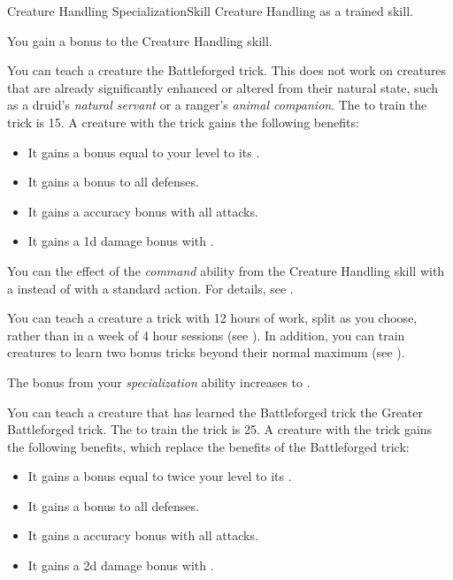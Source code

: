     \begin{feat}{Creature Handling Specialization}{Skill}
        \featpre Creature Handling as a trained skill.

         You gain a  bonus to the Creature Handling skill.

         You can teach a creature the Battleforged trick.
        This does not work on creatures that are already significantly enhanced or altered from their natural state, such as a druid's \textit{natural servant} or a ranger's \textit{animal companion}.
        The  to train the trick is 15.
        A creature with the trick gains the following benefits:
        \begin{itemize}
            \item It gains a bonus equal to your level to its .
            \item It gains a  bonus to all defenses.
            \item It gains a  accuracy bonus with all attacks.
            \item It gains a \plus1d damage bonus with .
        \end{itemize}

         You can  the effect of the \textit{command} ability from the Creature Handling skill with a  instead of with a standard action.
        For details, see .

         You can teach a creature a trick with 12 hours of work, split as you choose, rather than in a week of 4 hour sessions (see ).
        In addition, you can train creatures to learn two bonus tricks beyond their normal maximum (see ).

         The bonus from your \textit{specialization} ability increases to .

         You can teach a creature that has learned the Battleforged trick the Greater Battleforged trick.
        The  to train the trick is 25.
        A creature with the trick gains the following benefits, which replace the benefits of the Battleforged trick:
        \begin{itemize}
            \item It gains a bonus equal to twice your level to its .
            \item It gains a  bonus to all defenses.
            \item It gains a  accuracy bonus with all attacks.
            \item It gains a \plus2d damage bonus with .
        \end{itemize}


\end{feat}

